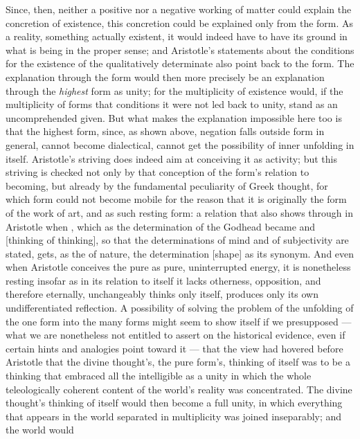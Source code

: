 Since, then, neither a positive nor a negative working of matter could
explain the concretion of existence, this concretion could be explained
only from the form. As a reality, something actually existent, it would
indeed have to have its ground in what is being in the proper sense; and
Aristotle's statements about the conditions for the existence of the
qualitatively determinate also point back to the form. The explanation
through the form would then more precisely be an explanation through the
\emph{highest} form as unity; for the multiplicity of existence would, if
the multiplicity of forms that conditions it were not led back to unity,
stand as an uncomprehended given. But what makes the explanation
impossible here too is that the highest form, since, as shown above,
negation falls outside form in general, cannot become dialectical, cannot
get the possibility of inner unfolding in itself. Aristotle's striving
does indeed aim at conceiving it as activity; but this striving is
checked not only by that conception of the form's relation to
becoming, but already by the fundamental peculiarity of Greek
thought, for which form could not become mobile for the reason that it is
originally the form of the work of art, and as such resting form: a
relation that also shows through in Aristotle when , which as
the determination of the Godhead became  and 
[thinking of thinking], so that the determinations of mind and of
subjectivity are stated, gets, as the  of nature, the
determination  [shape] as its synonym. And even when Aristotle
conceives the pure  as pure, uninterrupted energy, it is
nonetheless resting insofar as in its relation to itself it lacks
otherness, opposition, and therefore eternally, unchangeably thinks only
itself, produces only its own undifferentiated reflection. A possibility
of solving the problem of the unfolding of the one form into the many
forms might seem to show itself if we presupposed --- what we are
nonetheless not entitled to assert on the historical evidence, even if
certain hints and analogies point toward it --- that the view had hovered
before Aristotle that the divine thought's, the pure form's, thinking of
itself was to be a thinking that embraced all the intelligible as a
unity in which the whole teleologically coherent content of the world's
reality was concentrated. The divine thought's thinking of itself would
then become a full unity, in which everything that appears in the world
separated in multiplicity was joined inseparably; and the world would
